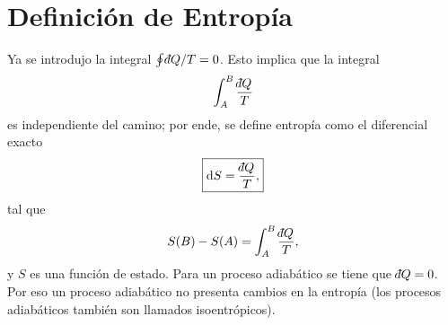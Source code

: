 \section{Definición de Entropía}
Ya se introdujo la integral $\oint \dbar Q / T = 0$. Esto implica que la integral
	$$ \int _A ^B \frac{\dbar Q}{T} $$
es independiente del camino; por ende, se define entropía como el diferencial exacto 
	$$ \boxed{ \dd{S} = \frac{\dbar Q}{T}, } $$
tal que
	$$ S(B) - S(A) = \int _A ^B \frac{\dbar Q}{T}, $$
y $S$ es una función de estado. Para un proceso adiabático se tiene que $\dbar Q = 0$. Por eso un proceso adiabático no presenta cambios en la entropía (los procesos adiabáticos también son llamados isoentrópicos).









